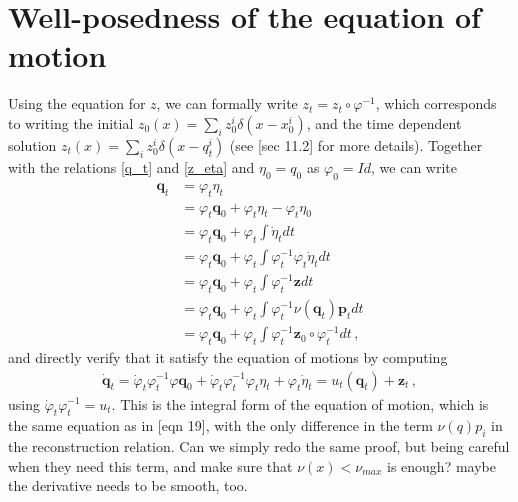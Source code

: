\documentclass[runningheads]{llncs}
\begin{document}
\section{Well-posedness of the equation of motion}
Using the equation for $z$, we can formally write $z_t = z_t \circ \varphi^{-1}$,
which corresponds to writing the initial $z_0(x) = \sum_i z_0^i\delta(x-x_0^i)$, 
and the time dependent solution $z_t(x) = \sum_i z_0^i\delta(x-q_t^i)$ (see 
\cite{holm2009euler}[sec 11.2] for more details). Together with the relations 
\eqref{q_t} and \eqref{z_eta} and $\eta_0 = q_0$ as $\varphi_0 = Id$, we can write
\begin{align*}
  \mathbf q_t &= \varphi_t \eta_t\\
   &= \varphi_t \mathbf q_0 + \varphi_t \eta_t-\varphi_t \eta_0\\
   &= \varphi_t \mathbf q_0 + \varphi_t \int \dot \eta_t dt\\
   &= \varphi_t \mathbf q_0 + \varphi_t \int \varphi_t^{-1} \varphi_t\dot \eta_t dt\\
   &= \varphi_t \mathbf q_0 + \varphi_t \int  \varphi_t^{-1}\mathbf z dt \\
   &= \varphi_t \mathbf q_0 + \varphi_t \int  \varphi_t^{-1}\nu(\mathbf q_t) \mathbf p_t  dt\\
   &= \varphi_t \mathbf q_0 + \varphi_t \int  \varphi_t^{-1}\mathbf z_0\circ \varphi_t^{-1} dt\, , 
\end{align*}
and directly verify that it satisfy the equation of motions by computing
\begin{align*}
  \dot {\mathbf q}_t = \dot \varphi_t \varphi_t^{-1} \varphi \mathbf q_0 + \dot
  \varphi_t \varphi_t^{-1} \varphi_t \eta_t + \varphi_t \dot \eta_t  = u_t(
  \mathbf q_t) + \mathbf z_t\, ,
\end{align*}
using $\dot \varphi_t\varphi_t^{-1} = u_t$. 
This is the integral form of the equation of motion, which is the same equation
as in \cite{holm2009euler}[eqn 19], with the only difference in the term $\nu(q) p_i$ 
in the reconstruction relation. 
{\color{red} Can we simply redo the same proof, but being careful when they need this term, 
and make sure that $\nu(x)<\nu_{max}$ is enough? maybe the derivative needs to be smooth, too. }
\fi



\end{document}
